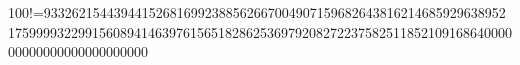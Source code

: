 100!=93326215443944152681699238856266700490715968264381621468592963895217599993229915608941463976156518286253697920827223758251185210916864000000000000000000000000